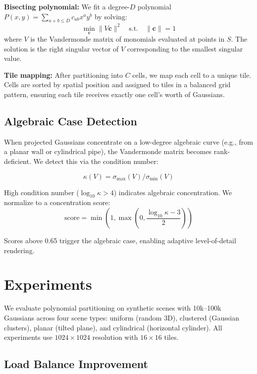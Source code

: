 \documentclass[10pt,twocolumn]{article}
\begin{document}
\textbf{Bisecting polynomial:} We fit a degree-$D$ polynomial $P(x,y) = \sum_{a+b \leq D} c_{ab} x^a y^b$ by solving:
\begin{equation}
    \min_{\mathbf{c}} \|V \mathbf{c}\|^2 \quad \text{s.t.} \quad \|\mathbf{c}\| = 1
\end{equation}
where $V$ is the Vandermonde matrix of monomials evaluated at points in $S$. The solution is the right singular vector of $V$ corresponding to the smallest singular value.

\textbf{Tile mapping:} After partitioning into $C$ cells, we map each cell to a unique tile. Cells are sorted by spatial position and assigned to tiles in a balanced grid pattern, ensuring each tile receives exactly one cell's worth of Gaussians.

\subsection{Algebraic Case Detection}

When projected Gaussians concentrate on a low-degree algebraic curve (e.g., from a planar wall or cylindrical pipe), the Vandermonde matrix becomes rank-deficient. We detect this via the condition number:

\begin{equation}
    \kappa(V) = \sigma_{\max}(V) / \sigma_{\min}(V)
\end{equation}

High condition number ($\log_{10} \kappa > 4$) indicates algebraic concentration. We normalize to a concentration score:
\begin{equation}
    \text{score} = \min\left(1, \max\left(0, \frac{\log_{10} \kappa - 3}{2}\right)\right)
\end{equation}

Scores above 0.65 trigger the algebraic case, enabling adaptive level-of-detail rendering.

\section{Experiments}

We evaluate polynomial partitioning on synthetic scenes with 10k--100k Gaussians across four scene types: uniform (random 3D), clustered (Gaussian clusters), planar (tilted plane), and cylindrical (horizontal cylinder). All experiments use $1024 \times 1024$ resolution with $16 \times 16$ tiles.

\subsection{Load Balance Improvement}
\end{document}
